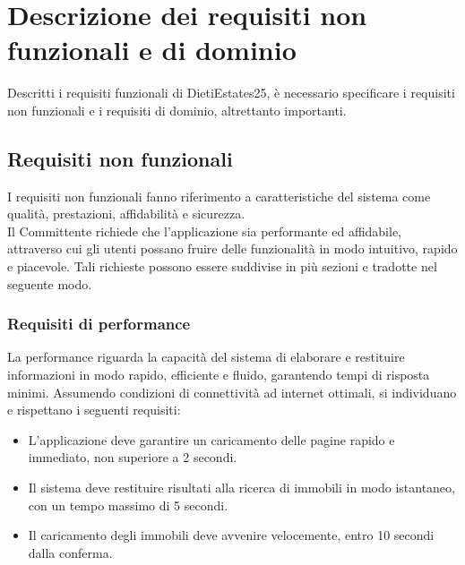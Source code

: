\documentclass{book}
\begin{document}
\newpage

\section{Descrizione dei requisiti non funzionali e di dominio}
Descritti i requisiti funzionali di DietiEstates25, è necessario specificare i requisiti non funzionali e i requisiti di dominio, altrettanto importanti.

\subsection{Requisiti non funzionali}
I requisiti non funzionali fanno riferimento a caratteristiche del sistema come qualità, prestazioni, affidabilità e sicurezza.\\
Il Committente richiede che l'applicazione sia performante ed affidabile, attraverso cui gli utenti possano fruire delle funzionalità in modo intuitivo, rapido e piacevole. Tali richieste possono essere suddivise in più sezioni e tradotte nel seguente modo.
\subsubsection{Requisiti di performance}
La performance riguarda la capacità del sistema di elaborare e restituire informazioni in modo rapido, efficiente e fluido, garantendo tempi di risposta minimi. Assumendo condizioni di connettività ad internet ottimali, si individuano e rispettano i seguenti requisiti:
\begin{itemize}
    \item L'applicazione deve garantire un caricamento delle pagine rapido e immediato, non superiore a 2 secondi.
    \item Il sistema deve restituire risultati alla ricerca di immobili in modo istantaneo, con un tempo massimo di 5 secondi.
    \item Il caricamento degli immobili deve avvenire velocemente, entro 10 secondi dalla conferma.
\end{itemize}
\end{document}
